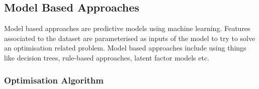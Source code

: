 \subsection{Model Based Approaches}
Model based approaches are predictive models using machine learning. Features associated to the dataset are parameterised as inputs of the model to try to solve an optimisation related problem. Model based approaches include using things like decision trees, rule-based approaches, latent factor models etc.

\subsubsection{Optimisation Algorithm}
 
